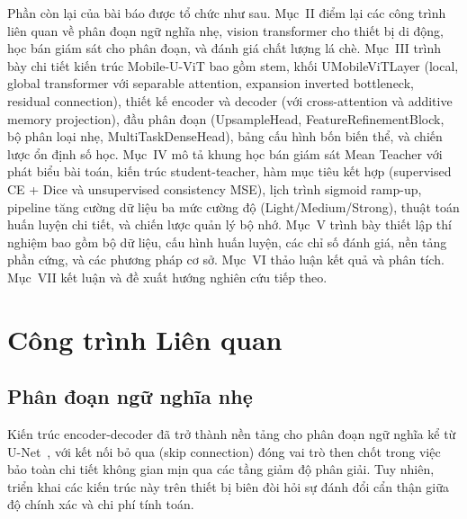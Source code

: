 \documentclass[conference]{IEEEtran}
\begin{document}
Phần còn lại của bài báo được tổ chức như sau. Mục~II điểm lại các công trình liên quan về phân đoạn ngữ nghĩa nhẹ, vision transformer cho thiết bị di động, học bán giám sát cho phân đoạn, và đánh giá chất lượng lá chè. Mục~III trình bày chi tiết kiến trúc Mobile-U-ViT bao gồm stem, khối UMobileViTLayer (local, global transformer với separable attention, expansion inverted bottleneck, residual connection), thiết kế encoder và decoder (với cross-attention và additive memory projection), đầu phân đoạn (UpsampleHead, FeatureRefinementBlock, bộ phân loại nhẹ, MultiTaskDenseHead), bảng cấu hình bốn biến thể, và chiến lược ổn định số học. Mục~IV mô tả khung học bán giám sát Mean Teacher với phát biểu bài toán, kiến trúc student-teacher, hàm mục tiêu kết hợp (supervised CE + Dice và unsupervised consistency MSE), lịch trình sigmoid ramp-up, pipeline tăng cường dữ liệu ba mức cường độ (Light/Medium/Strong), thuật toán huấn luyện chi tiết, và chiến lược quản lý bộ nhớ. Mục~V trình bày thiết lập thí nghiệm bao gồm bộ dữ liệu, cấu hình huấn luyện, các chỉ số đánh giá, nền tảng phần cứng, và các phương pháp cơ sở. Mục~VI thảo luận kết quả và phân tích. Mục~VII kết luận và đề xuất hướng nghiên cứu tiếp theo.


\section{Công trình Liên quan}

\subsection{Phân đoạn ngữ nghĩa nhẹ}

Kiến trúc encoder-decoder đã trở thành nền tảng cho phân đoạn ngữ nghĩa kể từ U-Net~\cite{b5}, với kết nối bỏ qua (skip connection) đóng vai trò then chốt trong việc bảo toàn chi tiết không gian mịn qua các tầng giảm độ phân giải. Tuy nhiên, triển khai các kiến trúc này trên thiết bị biên đòi hỏi sự đánh đổi cẩn thận giữa độ chính xác và chi phí tính toán.
\end{document}
